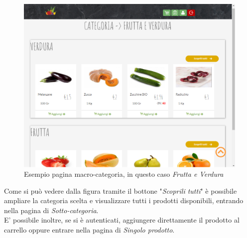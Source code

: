 	\begin{figure}[H]
		\includegraphics[width=\linewidth]{res/img/Macro-cat}
		\caption{Esempio pagina macro-categoria, in questo caso \textit{Frutta e Verdura}}
		\label{Pagina Macro-categoria}
	\end{figure}
	Come si può vedere dalla figura tramite il bottone "\textit{Scoprili tutti}" è possibile ampliare la categoria scelta e visualizzare tutti i prodotti disponibili, entrando nella pagina di \textit{Sotto-categoria}.\\
	E' possibile inoltre, se si è autenticati, aggiungere direttamente il prodotto al carrello oppure entrare nella pagina di \textit{Singolo prodotto}.

